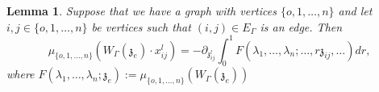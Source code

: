 \documentclass[11pt]{amsart}
\newtheorem{lem}[thm]{Lemma}
\theoremstyle{definition}
\theoremstyle{remark}
\numberwithin{equation}{section}
\begin{document}
\begin{lem}\label{IntegralR}
  Suppose that we have a graph with vertices $\{o,1,\dots,n\}$ and let $i,j \in \{o,1,\dots,n\}$ be vertices such that
  $(i,j)\in E_{\Gamma}$ is an edge. Then
  $$
  \mu_{\{o,1,\dots, n\}}\left(W_{\Gamma}(\mathfrak{z}_{e})\cdot x^l_{ij}\right)=-\partial_{\mathfrak{z}^l_{ij}}\int^1_0F(\lambda_1,\dots,\lambda_{n};\dots,r\mathfrak{z}_{ij},\dots)dr,
  $$
  where $F(\lambda_1,\dots,\lambda_{n};\mathfrak{z}_e):=\mu_{\{o,1,\dots, n\}}\left(W_{\Gamma}(\mathfrak{z}_{e})\right)$
\end{lem}
\begin{figure}[htp]
  \centering



\begin{tikzpicture}[x=0.75pt,y=0.75pt,yscale=-1,xscale=1]


\end{tikzpicture}
\end{figure}
\end{document}
